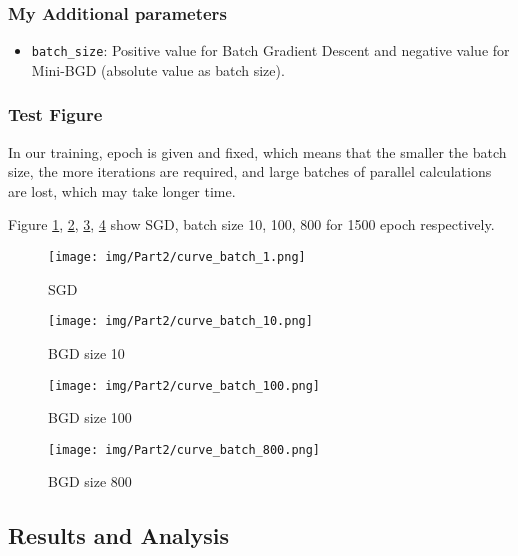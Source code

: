 \subsubsection{My Additional parameters}

\begin{itemize}
    \item \texttt{batch\_size}: Positive value for Batch Gradient Descent and negative value for Mini-BGD (absolute value as batch size).
\end{itemize}

\subsubsection{Test Figure}

In our training, epoch is given and fixed, which means that the smaller the batch size, the more iterations are required,
and large batches of parallel calculations are lost, which may take longer time.

Figure \ref{fig:p2batch1}, \ref{fig:p2batch10}, \ref{fig:p2batch100}, \ref{fig:p2batch800} show SGD, batch size 10, 100, 800 for 1500 epoch respectively.

\begin{figure}[!htbp]
    \centering
    \texttt{[image: img/Part2/curve\_batch\_1.png]}
    \caption{SGD}
    \label{fig:p2batch1}
\end{figure}

\begin{figure}[!htbp]
    \centering
    \texttt{[image: img/Part2/curve\_batch\_10.png]}
    \caption{BGD size 10}
    \label{fig:p2batch10}
\end{figure}

\begin{figure}[!htbp]
    \centering
    \texttt{[image: img/Part2/curve\_batch\_100.png]}
    \caption{BGD size 100}
    \label{fig:p2batch100}
\end{figure}

\begin{figure}[!htbp]
    \centering
    \texttt{[image: img/Part2/curve\_batch\_800.png]}
    \caption{BGD size 800}
    \label{fig:p2batch800}
\end{figure}

\subsection{Results and Analysis}

